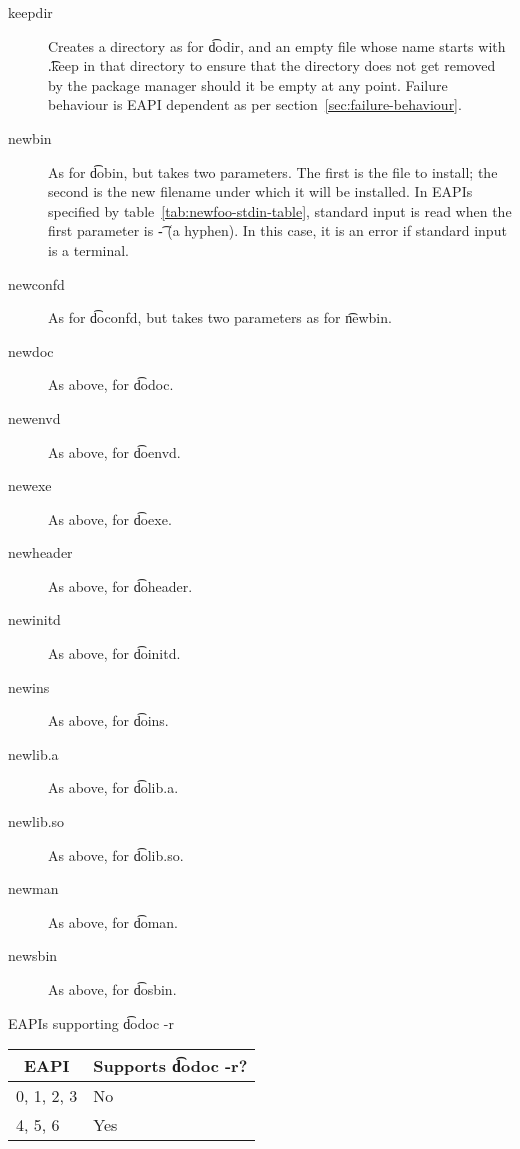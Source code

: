 \begin{description}
\item[keepdir] Creates a directory as for \t{dodir}, and an empty file whose name starts with
    \t{.keep} in that directory to ensure that the directory does not get removed by the
    package manager should it be empty at any point. Failure behaviour is EAPI dependent as per
    section~\ref{sec:failure-behaviour}.

\item[newbin]  As for \t{dobin}, but takes two parameters. The first is
    the file to install; the second is the new filename under which it will be installed. In EAPIs
    specified by table~\ref{tab:newfoo-stdin-table}, standard input is read when the first
    parameter is \t{-} (a hyphen). In this case, it is an error if standard input is a terminal.

\item[newconfd] As for \t{doconfd}, but takes two parameters as for \t{newbin}.

\item[newdoc] As above, for \t{dodoc}.

\item[newenvd] As above, for \t{doenvd}.

\item[newexe] As above, for \t{doexe}.

\item[newheader] As above, for \t{doheader}.

\item[newinitd] As above, for \t{doinitd}.

\item[newins] As above, for \t{doins}.

\item[newlib.a] As above, for \t{dolib.a}.

\item[newlib.so] As above, for \t{dolib.so}.

\item[newman] As above, for \t{doman}.

\item[newsbin] As above, for \t{dosbin}.

\end{description}

\begin{centertable}{EAPIs supporting \t{dodoc -r}}
    \label{tab:dodoc-table}
    \begin{tabular}{ll}
      \toprule
      \multicolumn{1}{c}{\textbf{EAPI}} &
      \multicolumn{1}{c}{\textbf{Supports \t{dodoc -r}?}} \\
      \midrule
      0, 1, 2, 3        & No  \\
      4, 5, 6           & Yes \\
      \bottomrule
    \end{tabular}
\end{centertable}

